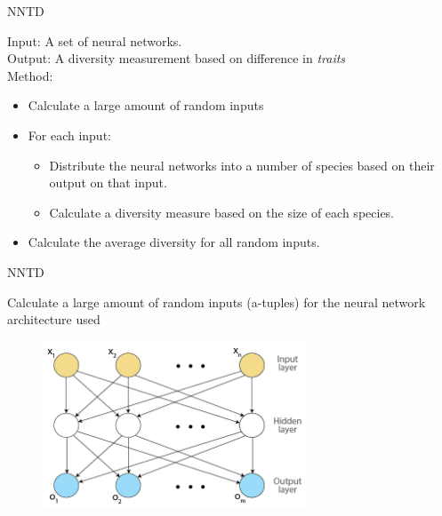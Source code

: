 \begin{frame}{NNTD}
\begin{center}
  Input: A set of neural networks.\\
  Output: A diversity measurement based on difference in \emph{traits}\\
  \vspace{30pt}
  Method:
  \begin{itemize}
  \item Calculate a large amount of random inputs
  \item For each input:
  \begin{itemize}
	  \item Distribute the neural networks into a number of species based on their output on that input.
	  \item Calculate a diversity measure based on the size of each species.
  \end{itemize}
  \item Calculate the average diversity for all random inputs.
  \end{itemize}
\end{center}
\end{frame}

\begin{frame}{NNTD}
\begin{center}
Calculate a large amount of random inputs (a-tuples) for the neural network architecture used
 \begin{figure}[p]
  \includegraphics[width=0.7\textwidth]{images/neuralnetwork.png}
  \end{figure}
\end{center}
\end{frame}

